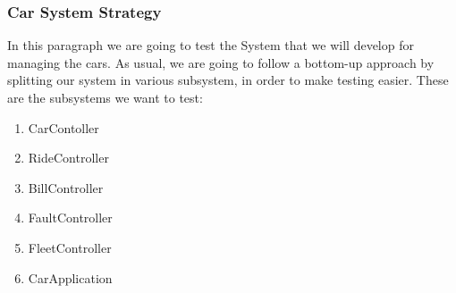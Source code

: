 \documentclass{article}
\begin{document}
\begin{Large}
\subsubsection{Car System Strategy}
\end{Large}
In this paragraph we are going to test the System that we will develop for managing the cars. As usual, we are going to follow a bottom-up approach by splitting our system in various subsystem, in order to make testing easier. These are the subsystems we want to test:

\begin{enumerate}
\item CarContoller
\item RideController
\item BillController
\item FaultController
\item FleetController
\item CarApplication
\end{enumerate}
\end{document}
